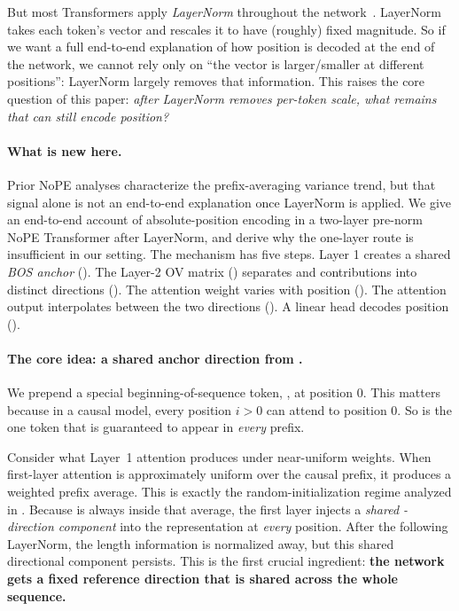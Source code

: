 \documentclass{article}
\theoremstyle{plain}
\theoremstyle{definition}
\theoremstyle{remark}
\begin{document}
But most Transformers apply \emph{LayerNorm} throughout the network~\citep{ba2016layer}.
LayerNorm takes each token’s vector and rescales it to have (roughly) fixed magnitude.
So if we want a full end-to-end explanation of how position is decoded at the end of the network,
we cannot rely only on “the vector is larger/smaller at different positions”:
LayerNorm largely removes that information.
This raises the core question of this paper: \emph{after LayerNorm removes per-token scale, what remains that can still encode position?}

\paragraph{What is new here.}
Prior NoPE analyses characterize the prefix-averaging variance trend, but that signal alone is not an end-to-end explanation once LayerNorm is applied.
We give an end-to-end account of absolute-position encoding in a two-layer pre-norm NoPE Transformer after LayerNorm, and derive why the one-layer route is insufficient in our setting.
The mechanism has five steps. Layer 1 creates a shared \emph{BOS anchor} (). The Layer-2 OV matrix () separates \bos and \nbos contributions into distinct directions (). The \bos attention weight varies with position (). The attention output interpolates between the two directions (). A linear head decodes position ().

\paragraph{The core idea: a shared anchor direction from \bos.}
We prepend a special beginning-of-sequence token, \bos, at position $0$.
This matters because in a causal model, every position $i>0$ can attend to position $0$.
So \bos is the one token that is guaranteed to appear in \emph{every} prefix.

Consider what Layer~1 attention produces under near-uniform weights.
When first-layer attention is approximately uniform over the causal prefix, it produces a weighted prefix average.
This is exactly the random-initialization regime analyzed in .
Because \bos is always inside that average, the first layer injects
a \emph{shared \bos-direction component} into the representation at \emph{every} position.
After the following LayerNorm, the length information is normalized away,
but this shared directional component persists.
This is the first crucial ingredient:
\textbf{the network gets a fixed reference direction that is shared across the whole sequence.}
\end{document}
